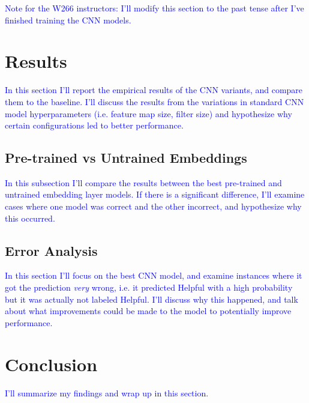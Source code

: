 \documentclass[11pt,a4paper]{article}
\begin{document}
	\textcolor{blue}{Note for the W266 instructors: I'll modify this section to the past tense after I've finished training the CNN models.}
	
	\section{Results}
	\textcolor{blue}{In this section I'll report the empirical results of the CNN variants, and compare them to the baseline. I'll discuss the results from the variations in standard CNN model hyperparameters (i.e. feature map size, filter size) and hypothesize why certain configurations led to better performance.}

	\subsection{Pre-trained vs Untrained Embeddings}
	\textcolor{blue}{In this subsection I'll compare the results between the best pre-trained and untrained embedding layer models. If there is a significant difference, I'll examine cases where one model was correct and the other incorrect, and hypothesize why this occurred.}
	
	\subsection{Error Analysis}
	\textcolor{blue}{In this section I'll focus on the best CNN model, and examine instances where it got the prediction \textit{very} wrong, i.e. it predicted Helpful with a high probability but it was actually not labeled Helpful. I'll discuss why this happened, and talk about what improvements could be made to the model to potentially improve performance.}
	
	\section{Conclusion}
	\textcolor{blue}{I'll summarize my findings and wrap up in this section.}

	
	
	

	
	
\end{document}
